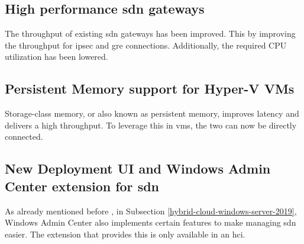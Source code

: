 \subsection*{High performance \acrshort{sdn} gateways}
The throughput of existing \acrshort{sdn} gateways has been improved. This by improving the throughput for \acrfull{ipsec} and \acrfull{gre} connections. Additionally, the required CPU utilization has been lowered.
\subsection*{Persistent Memory support for Hyper-V VMs}
Storage-class memory, or also known as persistent memory, improves latency and delivers a high throughput. To leverage this in \acrshort{vm}s, the two can now be directly connected.
\subsection*{New Deployment UI and Windows Admin Center extension for \acrshort{sdn}}
As already mentioned before , in Subsection \ref{hybrid-cloud-windows-server-2019}, Windows Admin Center also implements certain features to make managing \acrshort{sdn} easier. The extension that provides this is only available in an \acrshort{hci}.

\clearpage

